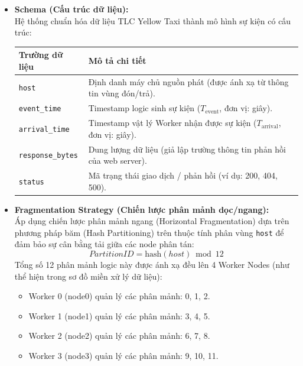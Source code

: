 \documentclass[12pt,a4paper]{article}
\begin{document}
\begin{itemize}[leftmargin=*]
    \item \textbf{Schema (Cấu trúc dữ liệu):} \\
    Hệ thống chuẩn hóa dữ liệu TLC Yellow Taxi thành mô hình sự kiện có cấu trúc:
    \begin{table}[H]
        \centering
        \small
        \begin{tabular}{lp{10cm}}
            \toprule
            \textbf{Trường dữ liệu} & \textbf{Mô tả chi tiết} \\
            \midrule
            \texttt{host} & Định danh máy chủ nguồn phát (được ánh xạ từ thông tin vùng đón/trả). \\
            \texttt{event\_time} & Timestamp logic sinh sự kiện ($T_{\text{event}}$, đơn vị: giây). \\
            \texttt{arrival\_time} & Timestamp vật lý Worker nhận được sự kiện ($T_{\text{arrival}}$, đơn vị: giây). \\
            \texttt{response\_bytes} & Dung lượng dữ liệu (giả lập trường thông tin phản hồi của web server). \\
            \texttt{status} & Mã trạng thái giao dịch / phản hồi (ví dụ: 200, 404, 500). \\
            \bottomrule
        \end{tabular}
    \end{table}

    \item \textbf{Fragmentation Strategy (Chiến lược phân mảnh dọc/ngang):} \\
    Áp dụng chiến lược phân mảnh ngang (Horizontal Fragmentation) dựa trên phương pháp băm (Hash Partitioning) trên thuộc tính phân vùng \texttt{host} để đảm bảo sự cân bằng tải giữa các node phân tán:
    {\large
    \begin{equation}
        \boxed{\displaystyle PartitionID = \text{hash}(host) \bmod 12}
    \end{equation}
    }
    Tổng số 12 phân mảnh logic này được ánh xạ đều lên 4 Worker Nodes (như thể hiện trong sơ đồ miền xử lý dữ liệu):
    \begin{itemize}[label={-}]
        \item Worker 0 (node0) quản lý các phân mảnh: 0, 1, 2.
        \item Worker 1 (node1) quản lý các phân mảnh: 3, 4, 5.
        \item Worker 2 (node2) quản lý các phân mảnh: 6, 7, 8.
        \item Worker 3 (node3) quản lý các phân mảnh: 9, 10, 11.
    \end{itemize}
\end{itemize}
\end{document}

